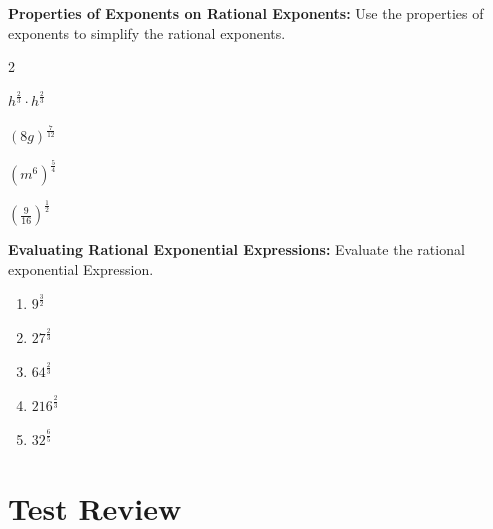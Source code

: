 \documentclass[12pt]{article}
\begin{document}
\textbf{Properties of Exponents on Rational Exponents:} Use the properties of exponents to simplify the rational exponents.\\

	\begin{enumerate}[resume]
	\end{enumerate}	

\textbf{Evaluating Rational Exponential Expressions:} Evaluate the rational exponential Expression.\\

	\begin{enumerate}[resume]
		\setlength\itemsep{1cm}
	
		\item $9^{\frac{3}{2}}$\\
		
		\item $27^{\frac{2}{3}}$\\
		
		\item $64^{\frac{2}{3}}$\\
		
		\item $216^{\frac{2}{3}}$\\
		
		\item $32^{\frac{6}{5}}$\\
	
	\end{enumerate}
	
\section*{Test Review}
\end{document}
